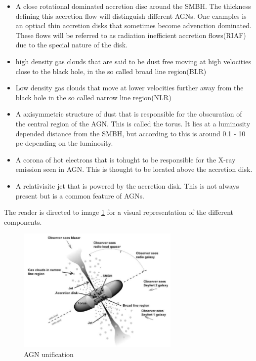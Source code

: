 \documentclass{article}
\begin{document}
\begin{itemize}
    \item A close rotational dominated accretion disc around the SMBH. The thickness defining this accretion flow will distinguish different AGNs. 
    One examples is an optiacl thin accretion disks that sometimes become advenction dominated.
    These flows will be referred to as radiation inefficient accretion flows(RIAF) due to the special nature of the disk.
    \item high density gas clouds that are said to be dust free moving at high velocities close to the black hole, in the so called broad line region(BLR)
    \item Low density gas clouds that move at lower velocities further away from the black hole in the so called narrow line region(NLR)
    \item A axisymmetric structure of dust that is responsible for the obscuration of the central region of the AGN. This is called the torus.
     It lies at a luminosity depended distance from the SMBH, but according to \cite{Netzer_2015} this is around 0.1 - 10 pc depending on the luminosity.
    \item A corona of hot electrons that is tohught to be responsible for the X-ray emission seen in AGN. This is thought to be located above the accretion disk. 
    \item A relativisitc jet that is powered by the accretion disk. This is not always present but is a common feature of AGNs.


\end{itemize}
The reader is directed to image \ref{fig:my_label} for a visual representation of the different components.


\begin{figure}
    \centering
    \includegraphics[width = 0.7\textwidth]{unified model agn.jpg}
    \caption{AGN unification}
    \label{fig:my_label}
\end{figure}
\end{document}
